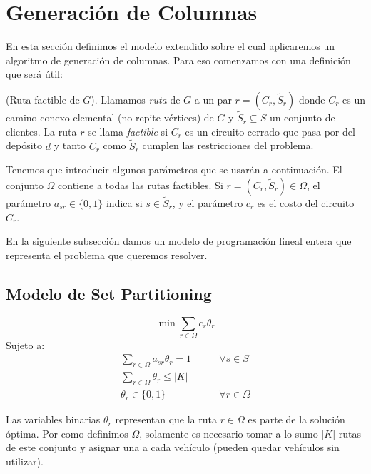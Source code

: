 \section{Generación de Columnas}

En esta sección definimos el modelo extendido sobre el cual aplicaremos un algoritmo de generación de columnas. Para eso comenzamos con una definición que será útil:

\begin{definition}
    (Ruta factible de $G$).
    Llamamos \emph{ruta} de $G$ a un par $r = (C_r, \tilde{S}_r)$ donde $C_r$ es un camino conexo elemental (no repite vértices) de $G$ y $\tilde{S}_r \subseteq S$ un conjunto de clientes. La ruta $r$ se llama \emph{factible} si $C_r$ es un circuito cerrado que pasa por del depósito $d$ y tanto $C_r$ como $\tilde{S}_r$ cumplen las restricciones del problema.
\end{definition}

Tenemos que introducir algunos parámetros que se usarán a continuación. El conjunto $\Omega$ contiene a todas las rutas factibles. Si $r = (C_r, \tilde{S}_r) \in \Omega$, el parámetro $a_{sr} \in \{0, 1\}$ indica si $s \in \tilde{S}_r$, y el parámetro $c_r$ es el costo del circuito $C_r$. 

En la siguiente subsección damos un modelo de programación lineal entera que representa el problema que queremos resolver.

\subsection{Modelo de Set Partitioning}
\label{section:set-partitioning}

\begin{equation}
    \min \sum_{r \in \Omega} c_r  \theta_r
\end{equation}
Sujeto a:
\begin{align}
    \sum_{r \in \Omega} {a_{sr}\theta_r} = 1
\qquad & \forall {s \in S} \label{eq:master1} \\
\sum_{r \in \Omega}{\theta_r} \leq |K| & \label{eq:master2} \\
\theta_r \in \{0, 1\} \qquad & \forall{r \in \Omega}
\end{align}

Las variables binarias $\theta_r$ representan que la ruta $r \in \Omega$ es parte de la solución óptima. Por como definimos $\Omega$, solamente es necesario tomar a lo sumo $|K|$ rutas de este conjunto y asignar una a cada vehículo (pueden quedar vehículos sin utilizar). 

